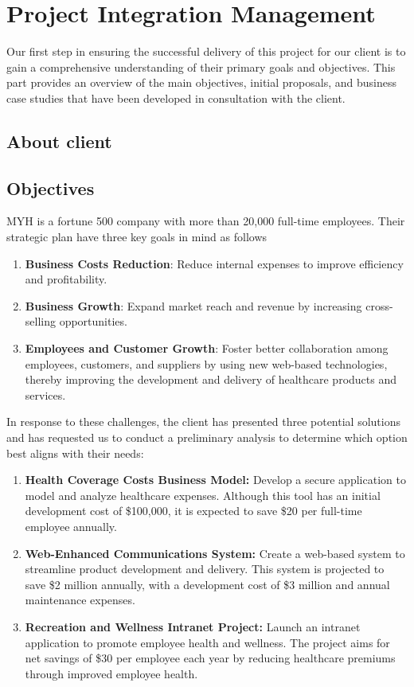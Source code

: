 \chapter{Project Integration Management}
Our first step in ensuring the successful delivery of this project for our client is to gain a comprehensive understanding of their primary goals and objectives. This part provides an overview of the main objectives, initial proposals, and business case studies that have been developed in consultation with the client.

\section{About client}



\section{Objectives}

MYH is a fortune 500 company with more than 20,000 full-time employees. Their strategic plan have three key goals in mind as follows

\begin{enumerate}
    \item \textbf{Business Costs Reduction}: Reduce internal expenses to improve efficiency and profitability.
    \item \textbf{Business Growth}: Expand market reach and revenue by increasing cross-selling opportunities.
    \item \textbf{Employees and Customer Growth}: Foster better collaboration among employees, customers, and suppliers by using new web-based technologies, thereby improving the development and delivery of healthcare products and services.
\end{enumerate}

In response to these challenges, the client has presented three potential solutions and has requested us to conduct a preliminary analysis to determine which option best aligns with their needs:

\begin{enumerate}[label=\textbf{\arabic*.}]
    \item \textbf{Health Coverage Costs Business Model:} Develop a secure application to model and analyze healthcare expenses. Although this tool has an initial development cost of \$100,000, it is expected to save \$20 per full-time employee annually.

    \item \textbf{Web-Enhanced Communications System:} Create a web-based system to streamline product development and delivery. This system is projected to save \$2 million annually, with a development cost of \$3 million and annual maintenance expenses.

    \item \textbf{Recreation and Wellness Intranet Project:} Launch an intranet application to promote employee health and wellness. The project aims for net savings of \$30 per employee each year by reducing healthcare premiums through improved employee health.
\end{enumerate}

